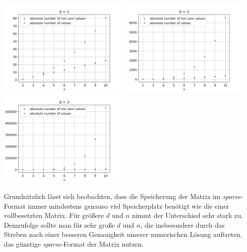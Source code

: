 \documentclass{scrartcl}
\begin{document}
\vspace{0.5cm}
{
  \centering
    \includegraphics[width=0.48\textwidth]{Figure_1}
    \includegraphics[width=0.48\textwidth]{Figure_2}\\
    \includegraphics[width=0.48\textwidth]{Figure_3}
    \vspace{-0.2cm}
}
\vspace{0.5cm}

Grundsätzlich lässt sich beobachten, dass die Speicherung der Matrix im \textit{sparse}-Format immer mindestens genauso viel Speicherplatz benötigt wie die einer vollbesetzten Matrix. Für größere $d$ und $n$ nimmt der Unterschied sehr stark zu. Demzufolge sollte man für sehr große $d$ und $n$, die insbesondere durch das Streben nach einer besseren Genauigkeit unserer numerischen Lösung auftreten, das günstige \textit{sparse}-Format der Matrix nutzen.

\pagebreak
\end{document}
